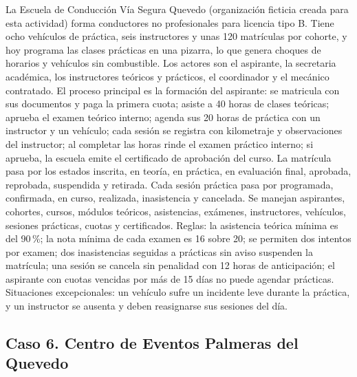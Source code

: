 \documentclass[11pt]{article}
\newcommand{\subseccion}[1]{\subsection{\textcolor{midblue}{#1}}}
\begin{document}
La Escuela de Conducción Vía Segura Quevedo (organización ficticia creada para esta actividad) forma conductores no profesionales para licencia tipo B. Tiene ocho vehículos de práctica, seis instructores y unas 120 matrículas por cohorte, y hoy programa las clases prácticas en una pizarra, lo que genera choques de horarios y vehículos sin combustible. Los actores son el aspirante, la secretaria académica, los instructores teóricos y prácticos, el coordinador y el mecánico contratado. El proceso principal es la formación del aspirante: se matricula con sus documentos y paga la primera cuota; asiste a 40 horas de clases teóricas; aprueba el examen teórico interno; agenda sus 20 horas de práctica con un instructor y un vehículo; cada sesión se registra con kilometraje y observaciones del instructor; al completar las horas rinde el examen práctico interno; si aprueba, la escuela emite el certificado de aprobación del curso. La matrícula pasa por los estados inscrita, en teoría, en práctica, en evaluación final, aprobada, reprobada, suspendida y retirada. Cada sesión práctica pasa por programada, confirmada, en curso, realizada, inasistencia y cancelada. Se manejan aspirantes, cohortes, cursos, módulos teóricos, asistencias, exámenes, instructores, vehículos, sesiones prácticas, cuotas y certificados. Reglas: la asistencia teórica mínima es del 90\,\%; la nota mínima de cada examen es 16 sobre 20; se permiten dos intentos por examen; dos inasistencias seguidas a prácticas sin aviso suspenden la matrícula; una sesión se cancela sin penalidad con 12 horas de anticipación; el aspirante con cuotas vencidas por más de 15 días no puede agendar prácticas. Situaciones excepcionales: un vehículo sufre un incidente leve durante la práctica, y un instructor se ausenta y deben reasignarse sus sesiones del día.

\subseccion{Caso 6. Centro de Eventos Palmeras del Quevedo}
\end{document}
